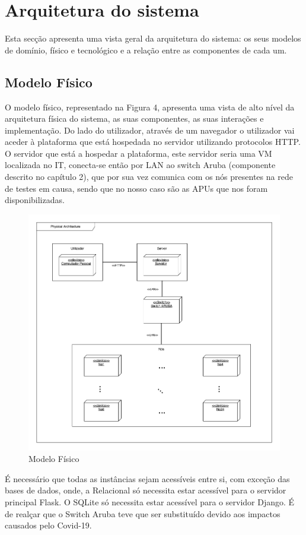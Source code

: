 \section{Arquitetura do sistema}
Esta secção apresenta uma vista geral da arquitetura do sistema: os seus modelos de domínio, físico e tecnológico e a relação entre as componentes de cada um.
\subsection{Modelo Físico}
O modelo físico, representado na Figura 4, apresenta uma vista de alto nível da arquitetura física do sistema, as suas componentes, as suas interações e implementação. \newline
Do lado do utilizador, através de um navegador o utilizador vai aceder à plataforma que está hospedada no servidor utilizando protocolos HTTP.\newline
O servidor que está a hospedar a plataforma, este servidor seria uma VM localizada no IT, conecta-se então por LAN ao switch Aruba (componente descrito no capítulo 2), que por sua vez comunica com os nós presentes na rede de testes em causa, sendo que no nosso caso são as APUs que nos foram disponibilizadas.\hfill
\begin{figure}[!ht]
    \centering
    \includegraphics[height=0.68\textheight, width=1\textwidth]{images/physical_arch.png}
    \caption{Modelo Físico}
    \label{fig:fisico}
\end{figure}
É necessário que todas  as instâncias sejam acessíveis entre si, com exceção das bases de dados, onde, a Relacional só necessita estar acessível para o servidor principal Flask. O SQLite só necessita estar acessível para o servidor Django. É de realçar que o Switch Aruba teve que ser substituído devido aos impactos causados pelo Covid-19.

